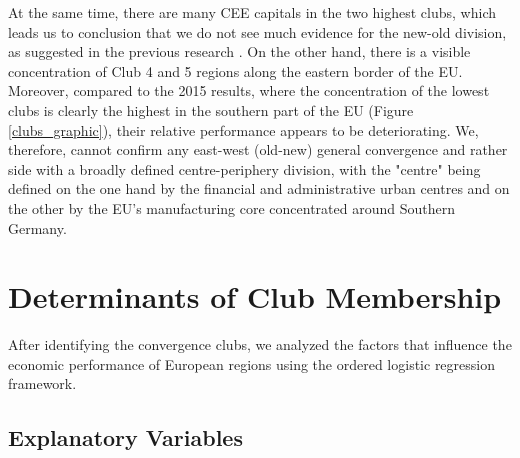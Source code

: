 \documentclass[11pt]{article}
\begin{document}
At the same time, there are many CEE capitals in the two highest clubs, which leads us to conclusion that we do not see much evidence for the new-old division, as suggested in the previous research \citep{eckey2007convergence}.
On the other hand, there is a visible concentration of Club 4 and 5 regions along the eastern border of the EU. Moreover, compared to the 2015 results, where the concentration of the lowest clubs is clearly the highest in the southern part of the EU (Figure \ref{clubs_graphic}), their relative performance appears to be deteriorating. We, therefore, cannot confirm any east-west (old-new) general convergence and rather side with a broadly defined centre-periphery division, with the "centre" being defined on the one hand by the financial and administrative urban centres and on the other by the EU's manufacturing core concentrated around Southern Germany.



\section{Determinants of Club Membership}
\label{Determinants of club membership}


 
After identifying the convergence clubs, we analyzed the factors that influence the economic performance of European regions using the ordered logistic regression framework.

\subsection{Explanatory Variables}
\end{document}
